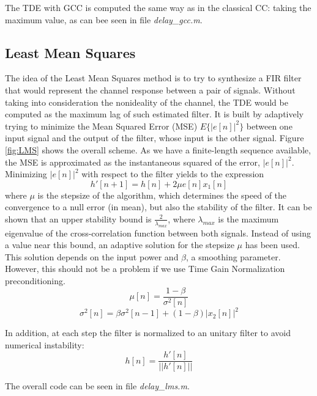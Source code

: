 The TDE with GCC is computed the same way as in the classical CC: taking the maximum value, as can bee seen in file \emph{delay\_gcc.m}\cite{delaygcc.m}.

\subsection{Least Mean Squares}
The idea of the Least Mean Squares method is to try to synthesize a FIR filter that would represent the channel response between a pair of signals. Without taking into consideration the nonideality of the channel, the TDE would be computed as the maximum lag of such estimated filter. It is built by adaptively trying to minimize the Mean Squared Error (MSE) $E\{|e[n]|^2\}$ between one input signal and the output of the filter, whose input is the other signal. Figure \ref{fig:LMS} shows the overall scheme. As we have a finite-length sequence available, the MSE is approximated as the instantaneous squared of the error, $|e[n]|^2$. Minimizing $|e[n]|^2$ with respect to the filter yields to the expression
\begin{dmath}
  h'[n+1] = h[n] + 2 \mu e[n] x_1[n]
\end{dmath}
where $\mu$ is the stepsize of the algorithm, which determines the speed of the convergence to a null error (in mean), but also the stability of the filter. It can be shown that an upper stability bound is $\frac{2}{\lambda_{max}}$, where $\lambda_{max}$ is the maximum eigenvalue of the cross-correlation function between both signals. Instead of using a value near this bound, an adaptive solution for the stepsize $\mu$ has been used. This solution depends on the input power and $\beta$, a smoothing parameter. However, this should not be a problem if we use Time Gain Normalization preconditioning.
\begin{dmath}
  \mu[n] = \frac{1-\beta}{\sigma^2[n]}
\end{dmath}
\begin{dmath}
  \sigma^2[n] = \beta \sigma^2[n-1] + (1-\beta)|x_2[n]|^2
\end{dmath}

In addition, at each step the filter is normalized to an unitary filter to avoid numerical instability:
\begin{dmath}
  h[n] = \frac{h'[n]}{||h'[n]||}
\end{dmath}

The overall code can be seen in file \emph{delay\_lms.m}\cite{delaylms.m}.

